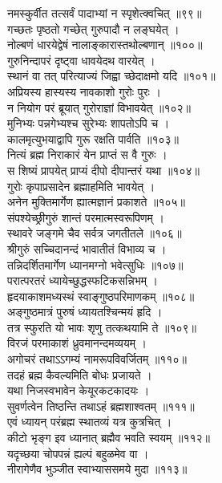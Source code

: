 नमस्कुर्वीत तत्सर्वं पादाभ्यां न स्पृशेत्क्वचित् ॥९९॥\\
गच्छतः पृष्ठतो गच्छेत् गुरुपादौ न लङ्घयेत् ।\\
नोल्बणं धारयेद्वेषं नालाङ्कारास्तथोल्बणान् ॥१००॥\\
गुरुनिन्दापरं दृष्ट्वा धावयेदथ वारयेत् ।\\
स्थानं वा तत् परित्याज्यं जिह्वा च्छेदाक्षमो यदि ॥१०१॥\\
अप्रियस्य हास्यस्य नावकाशो गुरोः पुरः ।\\
न नियोग परं ब्रूयात् गुरोराज्ञां विभावयेत् ॥१०२॥\\
मुनिभ्यः पन्नगेभ्यश्च सुरेभ्यः शापतोऽपि च ।\\
कालमृत्युभयाद्वापि गुरू रक्षति पार्वति ॥१०३॥\\
नित्यं ब्रह्म निराकारं येन प्राप्तं स वै गुरुः ।\\
स शिष्यं प्रापयेत् प्राप्यं दीपो दीपान्तरं यथा ॥१०४॥\\
गुरोः कृपाप्रसादेन ब्रह्माहमिति भावयेत् ।\\
अनेन मुक्तिमार्गेण ह्यात्मज्ञानं प्रकाशते ॥१०५॥\\
संपश्येच्छ्रीगुरुं शान्तं परमात्मस्वरूपिणम् ।\\
स्थावरे जङ्गमे चैव सर्वत्र जगतीतले ॥१०६॥\\
श्रीगुरुं सच्चिदानन्दं भावातीतं विभाव्य च ।\\
तन्निदर्शितमार्गेण ध्यानमग्नो भवेत्सुधिः ॥१०७॥\\
परात्परतरं ध्यायेच्छुद्धस्फटिकसन्निभम् ।\\
हृदयाकाशमध्यस्थं स्वाङ्गुष्ठपरिमाणकम् ॥१०८॥\\
अङ्गुष्ठमात्रं पुरुषं ध्यायतश्चिन्मयं हृदि ।\\
तत्र स्फुरति यो भावः शृणु तत्कथयामि ते ॥१०९॥\\
{ विरजं परमाकाशं  ध्रुवमानन्दमव्ययम् ।\\
अगोचरं तथाऽऽगम्यं नामरूपविवर्जितम् ॥११०॥\\
तदहं ब्रह्म कैवल्यमिति बोधः प्रजायते । }\\
यथा निजस्वभावेन केयूरकटकादयः ।\\
सुवर्णत्वेन तिष्ठन्ति तथाऽहं ब्रह्मशाश्वतम् ॥१११॥\\
एवं ध्यायन् परंब्रह्म स्थातव्यं यत्र कुत्रचित् ।\\
कीटो भृङ्ग इव ध्यानात् ब्रह्मैव भवति स्वयम् ॥११२॥\\
यदृच्छया चोपपन्नं ह्यल्पं बहुळमेव वा ।\\
नीरागेणैव भुञ्जीत स्वाभ्याससमये मुदा ॥११३॥\\
